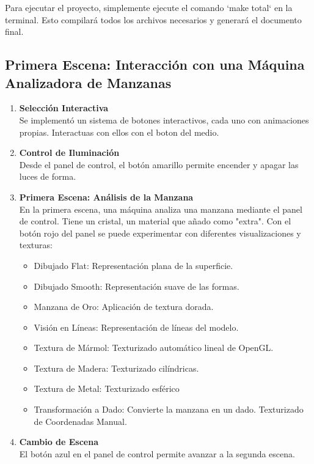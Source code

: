 \documentclass{article}
\begin{document}
Para ejecutar el proyecto, simplemente ejecute el comando `make total` en la terminal. Esto compilará todos los archivos necesarios y generará el documento final.

\subsection*{Primera Escena: Interacción con una Máquina Analizadora de Manzanas}

\begin{enumerate}
    \item \textbf{Selección Interactiva} \\
    Se implementó un sistema de botones interactivos, cada uno con animaciones propias. Interactuas con ellos con el boton del medio. 

    \item \textbf{Control de Iluminación} \\
    Desde el panel de control, el botón amarillo permite encender y apagar las luces de forma.

    \item \textbf{Primera Escena: Análisis de la Manzana} \\
    En la primera escena, una máquina analiza una manzana mediante el panel de control. Tiene un cristal, un material que añado como "extra". Con el botón rojo del panel se puede experimentar con diferentes visualizaciones y texturas:
    \begin{itemize}
        \item Dibujado Flat: Representación plana de la superficie.
        \item Dibujado Smooth: Representación suave de las formas.
        \item Manzana de Oro: Aplicación de textura dorada.
        \item Visión en Líneas: Representación de líneas del modelo.
        \item Textura de Mármol: Texturizado automático lineal de OpenGL.
        \item Textura de Madera: Texturizado cilíndricas.
        \item Textura de Metal: Texturizado esférico
        \item Transformación a Dado: Convierte la manzana en un dado. Texturizado de Coordenadas Manual. 
    \end{itemize}

    \item \textbf{Cambio de Escena} \\
    El botón azul en el panel de control permite avanzar a la segunda escena.
\end{enumerate}
\end{document}
